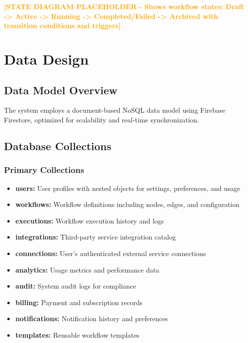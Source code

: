 \documentclass[12pt,a4paper]{article}
\begin{document}
\textcolor{orange}{\textbf{[STATE DIAGRAM PLACEHOLDER - Shows workflow states: Draft -> Active -> Running -> Completed/Failed -> Archived with transition conditions and triggers]}}

\newpage

\section{Data Design}

\subsection{Data Model Overview}
The system employs a document-based NoSQL data model using Firebase Firestore, optimized for scalability and real-time synchronization.

\subsection{Database Collections}

\subsubsection{Primary Collections}
\begin{itemize}
    \item \textbf{users:} User profiles with nested objects for settings, preferences, and usage
    \item \textbf{workflows:} Workflow definitions including nodes, edges, and configuration
    \item \textbf{executions:} Workflow execution history and logs
    \item \textbf{integrations:} Third-party service integration catalog
    \item \textbf{connections:} User's authenticated external service connections
    \item \textbf{analytics:} Usage metrics and performance data
    \item \textbf{audit:} System audit logs for compliance
    \item \textbf{billing:} Payment and subscription records
    \item \textbf{notifications:} Notification history and preferences
    \item \textbf{templates:} Reusable workflow templates
\end{itemize}
\end{document}
